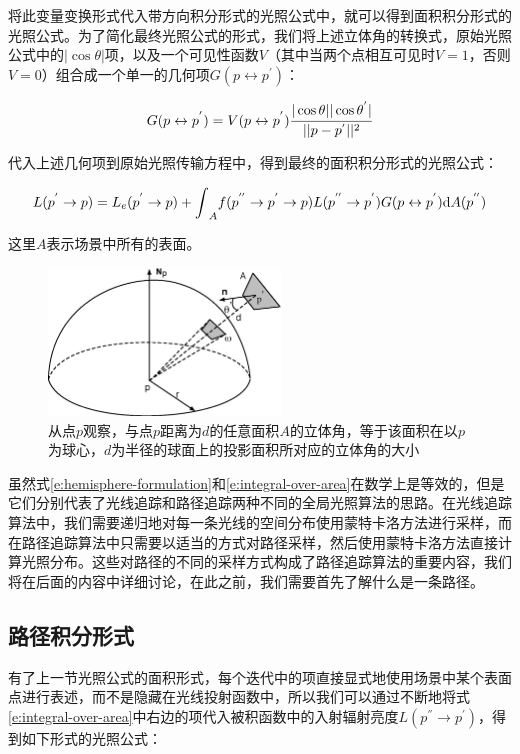 \noindent 将此变量变换形式代入带方向积分形式的光照公式中，就可以得到面积积分形式的光照公式。为了简化最终光照公式的形式，我们将上述立体角的转换式，原始光照公式中的$|\cos\theta|$项，以及一个可见性函数$V$（其中当两个点相互可见时$V=1$，否则$V=0$）组合成一个单一的几何项$G(p\leftrightarrow p^{'})$：

\begin{equation}
	G(p\leftrightarrow p^{'})=V(p\leftrightarrow p^{'}) \cfrac{|\cos\theta||\cos\theta^{'}|}{||p-p^{'}||^2}
\end{equation} 

\noindent 代入上述几何项到原始光照传输方程中，得到最终的面积积分形式的光照公式：

\begin{equation}\label{e:integral-over-area}
	L(p^{'}\to p)=L_e(p^{'}\to p)+{\rm \int}_A f(p^{''}\to p^{'}\to p)L(p^{''}\to p^{'})G(p\leftrightarrow p^{'}){\rm d}A(p^{''})
\end{equation}

\noindent 这里$A$表示场景中所有的表面。

\begin{figure}
	\sidecaption
	\includegraphics[width=0.55\textwidth]{figures/pt/solid-to-area}
	\caption{从点$p$观察，与点$p$距离为$d$的任意面积$A$的立体角，等于该面积在以$p$为球心，$d$为半径的球面上的投影面积所对应的立体角的大小}
	\label{f:pt-solid-to-area}
\end{figure}

虽然式\ref{e:hemisphere-formulation}和\ref{e:integral-over-area}在数学上是等效的，但是它们分别代表了光线追踪和路径追踪两种不同的全局光照算法的思路。在光线追踪算法中，我们需要递归地对每一条光线的空间分布使用蒙特卡洛方法进行采样，而在路径追踪算法中只需要以适当的方式对路径采样，然后使用蒙特卡洛方法直接计算光照分布。这些对路径的不同的采样方式构成了路径追踪算法的重要内容，我们将在后面的内容中详细讨论，在此之前，我们需要首先了解什么是一条路径。






\subsection{路径积分形式}
有了上一节光照公式的面积形式，每个迭代中的项直接显式地使用场景中某个表面点进行表述，而不是隐藏在光线投射函数中，所以我们可以通过不断地将式\ref{e:integral-over-area}中右边的项代入被积函数中的入射辐射亮度$L(p^{''}\to p^{'})$，得到如下形式的光照公式：


